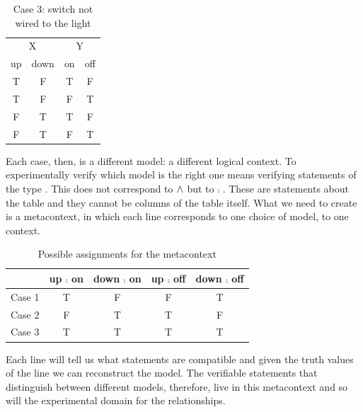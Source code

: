 \begin{table}[h]
	\centering
	\begin{tabular}{c|c|c|c}
		\multicolumn{2}{c|}{X} & \multicolumn{2}{c}{Y} \\
		up & down & on & off \\
		\hline
		T & F & T & F \\
		T & F & F & T \\
		F & T & T & F \\
		F & T & F & T \\
	\end{tabular}
	\caption{Case 3: switch not wired to the light}
\end{table}

Each case, then, is a different model: a different logical context. To experimentally verify which model is the right one means verifying statements of the type . This does not correspond to  $\wedge$  but to  $\comp$ . These are statements about the table and they cannot be columns of the table itself. What we need to create is a metacontext, in which each line corresponds to one choice of model, to one context.

\begin{table}[h]
	\centering
	\begin{tabular}{r|c|c|c|c}
		& up $\comp$ on & down $\comp$ on & up $\comp$ off & down $\comp$ off \\
		\hline
		Case 1 & T & F & F & T \\
		Case 2 & F & T & T & F \\
		Case 3 & T & T & T & T \\
	\end{tabular}
	\caption{Possible assignments for the metacontext}
\end{table}

Each line will tell us what statements are compatible and given the truth values of the line we can reconstruct the model. The verifiable statements that distinguish between different models, therefore, live in this metacontext and so will the experimental domain for the relationships.

